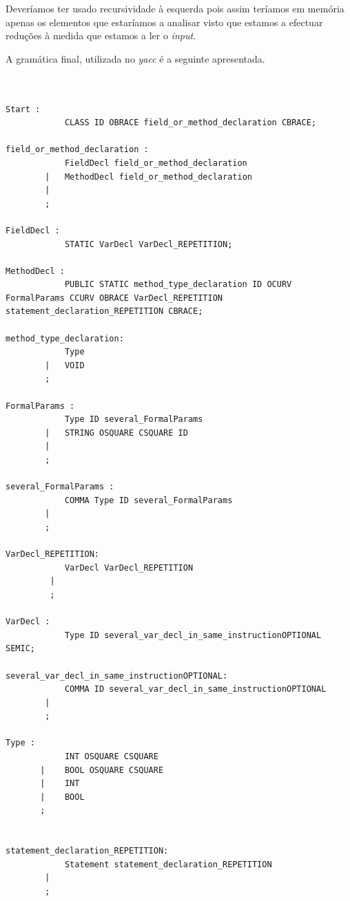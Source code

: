 \documentclass[12pt]{article}
\begin{document}
Deveríamos ter usado recursividade  à esquerda pois assim teríamos em memória apenas os elementos que estaríamos a analisar visto que estamos a efectuar reduções à medida que estamos a ler o \emph{input}.


A gramática final, utilizada no \emph{yacc} é a seguinte apresentada.

\begin{lstlisting}


Start :
            CLASS ID OBRACE field_or_method_declaration CBRACE;

field_or_method_declaration :
            FieldDecl field_or_method_declaration               
        |   MethodDecl field_or_method_declaration              
        | 
        ;

FieldDecl :
            STATIC VarDecl VarDecl_REPETITION;

MethodDecl :
            PUBLIC STATIC method_type_declaration ID OCURV FormalParams CCURV OBRACE VarDecl_REPETITION statement_declaration_REPETITION CBRACE;

method_type_declaration:
            Type            
        |   VOID            
        ;

FormalParams : 
            Type ID several_FormalParams        
        |   STRING OSQUARE CSQUARE ID           
        |                                           
        ;

several_FormalParams : 
            COMMA Type ID several_FormalParams      
        |                                               
        ;

VarDecl_REPETITION:
            VarDecl VarDecl_REPETITION      
         |                                      
         ;

VarDecl :
            Type ID several_var_decl_in_same_instructionOPTIONAL SEMIC;

several_var_decl_in_same_instructionOPTIONAL:
            COMMA ID several_var_decl_in_same_instructionOPTIONAL       
        |                                                                   
        ;

Type :
            INT OSQUARE CSQUARE        
       |    BOOL OSQUARE CSQUARE       
       |    INT                        
       |    BOOL                       
       ;
    

statement_declaration_REPETITION:
            Statement statement_declaration_REPETITION          
        |                                                           
        ;


\end{lstlisting}
\end{document}
